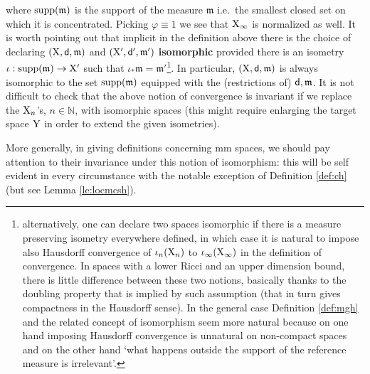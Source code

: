 \documentclass[11pt]{article}
\numberwithin{equation}{section}
\newcommand{\N}{\mathbb{N}}
\newcommand{\X}{{\rm X}}
\newcommand{\Y}{{\rm Y}}
\newcommand{\sfd}{{\sf d}}
\newcommand{\mm}{{\mathfrak m}}
\newcommand{\supp}{{\rm supp}}
\begin{document}
where   $\supp(\mm)$ is the support of the measure $\mm$ i.e.\ the smallest closed set on which it is concentrated. Picking $\varphi\equiv1$ we see that $\X_\infty$ is normalized as well. It is worth pointing out that implicit in the definition above there is the choice of declaring $(\X,\sfd,\mm)$ and $(\X',\sfd',\mm')$ {\bf isomorphic} provided there is an isometry $\iota:\supp(\mm)\to\X'$ such that $\iota_*\mm=\mm'$\footnote{alternatively, one can declare two spaces isomorphic if there is a measure preserving isometry everywhere defined, in which case it is natural to impose also Hausdorff convergence of $\iota_n(\X_n)$ to $\iota_\infty(\X_\infty)$ in the definition of convergence. In spaces with a lower Ricci and an upper dimension bound, there is little difference between these two notions, basically thanks to the doubling property that is implied by such assumption (that in turn gives compactness in the Hausdorff sense). In the general case Definition \ref{def:mgh}  and the related concept of isomorphism seem more natural because on one hand imposing Hausdorff convergence is unnatural on non-compact spaces and on the other hand `what happens outside the support of the reference measure is irrelevant'.}. In particular, $(\X,\sfd,\mm)$ is always isomorphic to the set $\supp(\mm)$ equipped with the (restrictions of) $\sfd,\mm$.  It is not difficult to check that the above notion of convergence is invariant if we replace the $\X_n$'s, $n\in\N$, with isomorphic spaces (this might require enlarging the target space $\Y$ in order to extend the given isometries). 

More generally, in giving definitions concerning mm spaces, we should pay attention to their invariance under this notion of isomorphism: this will be self evident in every circumstance with the notable exception of Definition \ref{def:ch} (but see Lemma \ref{le:locmcsh}).
\end{document}
